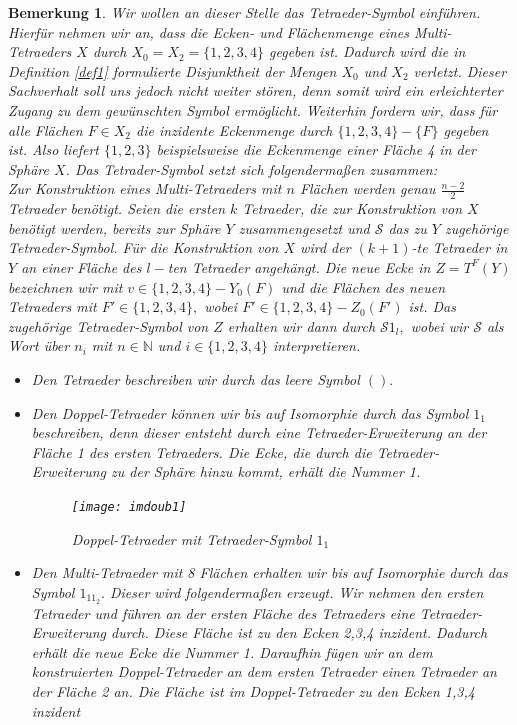 \documentclass[12pt,titlepage,twoside,cleardoublepage]{article}
\theoremstyle{nummermitklammern}
\newtheorem{bemerkung}[temp]{Bemerkung}
\newtheorem{bemerkung}[zahl]{Bemerkung}
\numberwithin{equation}{section}
\begin{document}
\begin{bemerkung}
Wir wollen an dieser Stelle das Tetraeder-Symbol einführen. Hierfür nehmen wir an, dass die Ecken- und Flächenmenge eines Multi-Tetraeders $X$ durch $X_0=X_2=\{1,2,3,4\}$ gegeben ist. Dadurch wird die in Definition \ref{def1} formulierte Disjunktheit der Mengen $X_0$ und $X_2$ verletzt. Dieser Sachverhalt soll uns jedoch nicht weiter stören, denn somit wird ein erleichterter Zugang zu dem gewünschten Symbol ermöglicht. Weiterhin fordern wir, dass für alle Flächen $F\in X_2$ die inzidente Eckenmenge durch $\{1,2,3,4\}-\{F\}$ gegeben ist. Also liefert $\{1,2,3\}$ beispielsweise die Eckenmenge einer Fläche 4 in der Sphäre $X$.
Das Tetrader-Symbol setzt sich folgendermaßen zusammen:\\
 Zur Konstruktion eines Multi-Tetraeders mit $n$ Flächen werden genau $\frac{n-2}{2}$ Tetraeder benötigt. Seien die ersten $k$ Tetraeder, die zur Konstruktion von $X$ benötigt werden, bereits zur Sphäre $Y$ zusammengesetzt und $\mathcal{S}$ das zu $Y$ zugehörige Tetraeder-Symbol. Für die Konstruktion von $X$ wird der $(k+1)$-te Tetraeder in $Y$ an einer Fläche des $l-$ten Tetraeder angehängt. Die neue Ecke in $Z=T^F(Y)$ bezeichnen wir mit $v\in \{1,2,3,4\}-Y_0(F)$ und die Flächen des neuen Tetraeders mit $F'\in\{1,2,3,4\},$ wobei $F'\in \{1,2,3,4\}-Z_0(F')$ ist. Das zugehörige Tetraeder-Symbol von $Z$ erhalten wir dann durch $\mathcal{S}1_l,$ wobei wir $\mathcal{S}$ als Wort über $n_i$ mit $n\in \mathbb{N}$ und $i \in \{1,2,3,4\}$ interpretieren.
\begin{itemize}
\item Den Tetraeder beschreiben wir durch das leere Symbol $().$
\item Den Doppel-Tetraeder können wir bis auf Isomorphie durch das Symbol $1_1$ beschreiben, denn dieser entsteht durch eine Tetraeder-Erweiterung an der Fläche 1 des ersten Tetraeders. Die Ecke, die durch die Tetraeder-Erweiterung zu der Sphäre hinzu kommt, erhält die Nummer 1.  
\begin{figure}[H]
\begin{center}
\texttt{[image: imdoub1]}
\end{center}
\caption{Doppel-Tetraeder mit Tetraeder-Symbol $1_1$}
\end{figure}
\item Den Multi-Tetraeder mit 8 Flächen erhalten wir bis auf Isomorphie durch das Symbol $1_11_2.$ Dieser wird folgendermaßen erzeugt. Wir nehmen den ersten Tetraeder und führen an der ersten Fläche des Tetraeders eine Tetraeder-Erweiterung durch. Diese Fläche ist zu den Ecken 2,3,4 inzident. Dadurch erhält die neue Ecke die Nummer 1. Daraufhin fügen wir an dem konstruierten Doppel-Tetraeder an dem ersten Tetraeder einen Tetraeder an der Fläche 2 an. Die Fläche ist im Doppel-Tetraeder zu den Ecken 1,3,4 inzident  

\end{itemize}
\end{bemerkung}
\end{document}
